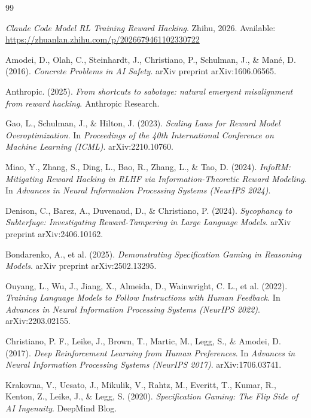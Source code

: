 \documentclass[11pt,a4paper]{article}
\begin{document}
\begin{thebibliography}{99}

\textit{Claude Code Model RL Training Reward Hacking}. Zhihu, 2026. Available: \url{https://zhuanlan.zhihu.com/p/2026679461102330722}

Amodei, D., Olah, C., Steinhardt, J., Christiano, P., Schulman, J., \& Man\'{e}, D. (2016). \textit{Concrete Problems in AI Safety}. arXiv preprint arXiv:1606.06565.

Anthropic. (2025). \textit{From shortcuts to sabotage: natural emergent misalignment from reward hacking}. Anthropic Research.

Gao, L., Schulman, J., \& Hilton, J. (2023). \textit{Scaling Laws for Reward Model Overoptimization}. In \textit{Proceedings of the 40th International Conference on Machine Learning (ICML)}. arXiv:2210.10760.

Miao, Y., Zhang, S., Ding, L., Bao, R., Zhang, L., \& Tao, D. (2024). \textit{InfoRM: Mitigating Reward Hacking in RLHF via Information-Theoretic Reward Modeling}. In \textit{Advances in Neural Information Processing Systems (NeurIPS 2024)}.

Denison, C., Barez, A., Duvenaud, D., \& Christiano, P. (2024). \textit{Sycophancy to Subterfuge: Investigating Reward-Tampering in Large Language Models}. arXiv preprint arXiv:2406.10162.

Bondarenko, A., et al. (2025). \textit{Demonstrating Specification Gaming in Reasoning Models}. arXiv preprint arXiv:2502.13295.

Ouyang, L., Wu, J., Jiang, X., Almeida, D., Wainwright, C. L., et al. (2022). \textit{Training Language Models to Follow Instructions with Human Feedback}. In \textit{Advances in Neural Information Processing Systems (NeurIPS 2022)}. arXiv:2203.02155.

Christiano, P. F., Leike, J., Brown, T., Martic, M., Legg, S., \& Amodei, D. (2017). \textit{Deep Reinforcement Learning from Human Preferences}. In \textit{Advances in Neural Information Processing Systems (NeurIPS 2017)}. arXiv:1706.03741.

Krakovna, V., Uesato, J., Mikulik, V., Rahtz, M., Everitt, T., Kumar, R., Kenton, Z., Leike, J., \& Legg, S. (2020). \textit{Specification Gaming: The Flip Side of AI Ingenuity}. DeepMind Blog.


\end{thebibliography}
\end{document}
